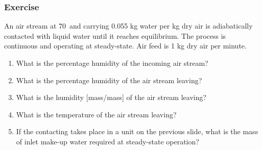 \begin{frame}\frametitle{Exercise}
	An air stream at 70\degC$\,$ and carrying 0.055 kg water per kg dry air is adiabatically contacted with liquid water until it reaches equilibrium. The process is continuous and operating at steady-state. Air feed is 1 kg dry air per minute.
	
	\begin{enumerate}
		\item	What is the percentage humidity of the incoming air stream?
		\item	What is the percentage humidity of the air stream leaving?
		\item	What is the humidity [mass/mass] of the air stream leaving?
		\item	What is the temperature of the air stream leaving?
		\item	If the contacting takes place in a unit on the previous slide, what is the mass of inlet make-up water required at steady-state operation?
	\end{enumerate}
\end{frame}


% 	

